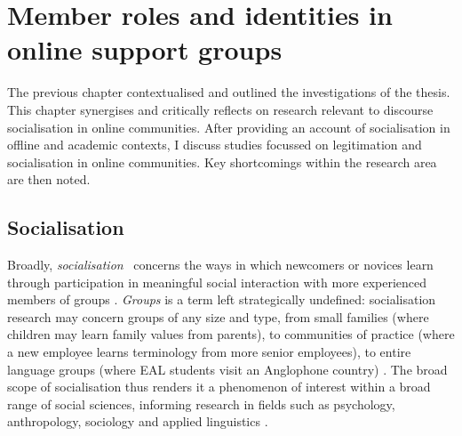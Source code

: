 \chapter{Member roles and identities in online support groups}

   The previous chapter contextualised and outlined the investigations of the thesis. This chapter synergises and critically reflects on research relevant to discourse socialisation in online communities. After providing an account of socialisation in offline and academic contexts, I discuss studies focussed on legitimation and socialisation in online communities. Key shortcomings within the research area are then noted.




   \section{Socialisation}

	  Broadly, \emph{socialisation}~
	  concerns the ways in which newcomers or novices learn through participation in meaningful social interaction with more experienced members of groups \cite{ochs_socialization_1991}. \emph{Groups} is a term left strategically undefined: socialisation research may concern groups of any size and type, from small families (where children may learn family values from parents), to communities of practice (where a new employee learns terminology from more senior employees), to entire language groups (where EAL students visit an Anglophone country) \cite{schieffelin_language_1986}. The broad scope of socialisation thus renders it a phenomenon of interest within a broad range of social sciences, informing research in fields such as psychology, anthropology, sociology and applied linguistics \cite[p.~172]{duff_language_2010}. 

